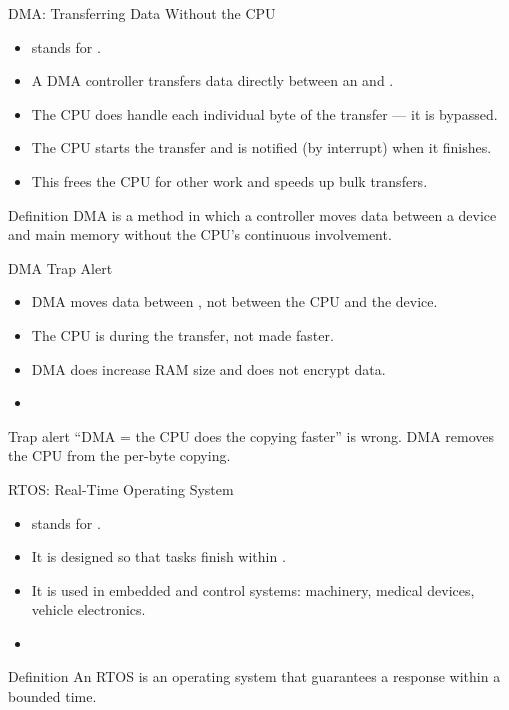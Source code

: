 \documentclass[aspectratio=169]{beamer}
\begin{document}
\begin{frame}{DMA: Transferring Data Without the CPU}
  \begin{itemize}
    \item {} stands for .
    \item A DMA controller transfers data directly between an  and .
    \item The CPU does  handle each individual byte of the transfer
      --- it is bypassed.
    \item The CPU starts the transfer and is notified (by interrupt) when it
      finishes.
    \item This frees the CPU for other work and speeds up bulk transfers.
  \end{itemize}
  \begin{block}{Definition}
    DMA is a method in which a controller moves data between a device and
    main memory without the CPU's continuous involvement.
  \end{block}
\end{frame}

\begin{frame}{DMA Trap Alert}
  \begin{itemize}
    \item DMA moves data between , not
      between the CPU and the device.
    \item The CPU is  during the transfer, not made faster.
    \item DMA does  increase RAM size and does not encrypt data.
    \item {}
  \end{itemize}
  \begin{alertblock}{Trap alert}
    ``DMA = the CPU does the copying faster'' is wrong. DMA removes the CPU
    from the per-byte copying.
  \end{alertblock}
\end{frame}

\begin{frame}{RTOS: Real-Time Operating System}
  \begin{itemize}
    \item {} stands for .
    \item It is designed so that tasks finish within .
    \item It is used in embedded and control systems: machinery, medical
      devices, vehicle electronics.
    \item {}
  \end{itemize}
  \begin{block}{Definition}
    An RTOS is an operating system that guarantees a response within a
    bounded time.
  \end{block}
\end{frame}
\end{document}
